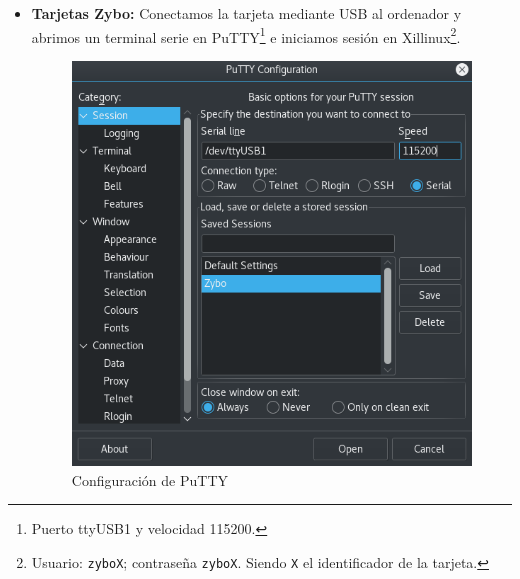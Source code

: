 \begin{itemize}
	\newpage
	\item \textbf{Tarjetas Zybo:} Conectamos la tarjeta mediante USB al ordenador y abrimos un terminal serie en PuTTY\footnote{Puerto ttyUSB1 y velocidad 115200.} e iniciamos sesión en Xillinux\footnote{Usuario: \texttt{zyboX}; contraseña \texttt{zyboX}. Siendo \texttt{X} el identificador de la tarjeta.}.
	
	\begin{figure}[h]
		\centering
		\includegraphics[scale=0.7]{Anexos/Anexo2/Infraestructura/PuTTY.png}
		\caption{Configuración de PuTTY}
		\label{Configuración de PuTTY}
	\end{figure}
	

\end{itemize}

